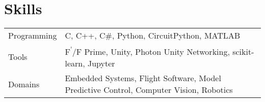 \documentclass[a4paper,12pt]{article}
\begin{document}
\section{Skills}
\begin{tabularx}{\linewidth}{@{}l X@{}}
Programming & \normalsize{C, C++, C\#, Python, CircuitPython, MATLAB}\\
Tools & \normalsize{F\textsuperscript{\'{}}/F Prime, Unity, Photon Unity Networking, scikit-learn, Jupyter}\\
Domains & \normalsize{Embedded Systems, Flight Software, Model Predictive Control, Computer Vision, Robotics}\\
\end{tabularx}

\vfill
{}
\end{document}
